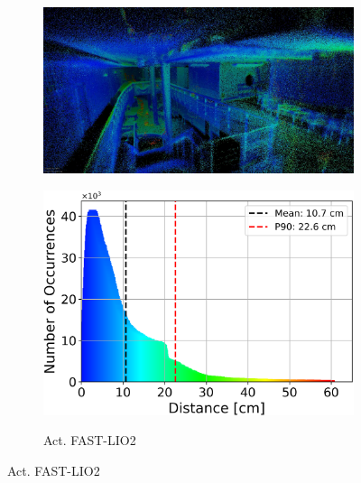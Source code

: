\documentclass[english, bachelor, utf8]{base/thesis_telematics}
\begin{document}
\begin{figure}
    \centering
\begin{subfigure}{0.45\textwidth}
    \centering
    \includegraphics[width=\textwidth]{pics/results_images/a_lio.jpg}
    \label{fig:results_act_lio}
\end{subfigure}

\begin{subfigure}{0.45\textwidth}
    \centering
    \includegraphics[width=\textwidth]{pics/histogram_results/histogram_cond_actuated_lio.png}
    \label{fig:hist_act_lio}
    \caption{Act. FAST-LIO2}
\end{subfigure}


\end{figure}
\end{document}
